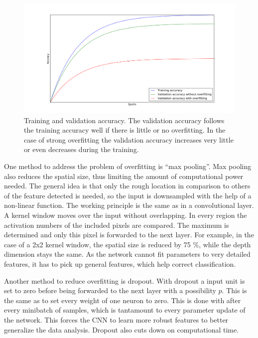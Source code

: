 \begin{figure}
\centering
\includegraphics[scale=0.35]{overfittingacc.png}
\caption{Training and validation accuracy. The validation accuracy follows the training accuracy well if there is little or no overfitting. In the case of strong overfitting the validation accuracy increases very little or even decreases during the training.}
\label{accuracy}
\end{figure}
One method to address the problem of overfitting is \enquote{max pooling}. Max pooling also reduces the spatial size, thus limiting the amount of computational power needed. The general idea is that only the rough location in comparison to others of the feature detected is needed, so the input is downsampled with the help of a non-linear function. The working principle is the same as in a convolutional layer. A kernel window moves over the input without overlapping. In every region the activation numbers of the included pixels are compared. The maximum is determined and only this pixel is forwarded to the next layer. For example, in the case of a 2x2 kernel window, the spatial size is reduced by 75 \%, while the depth dimension stays the same. As the network cannot fit parameters to very detailed features, it has to pick up general features, which help correct classification. 

Another method to reduce overfitting is dropout. With dropout a input unit is set to zero before being forwarded to the next layer with a possibility $p$. This is the same as to set every weight of one neuron to zero. This is done with after every minibatch of samples, which is tantamount to every parameter update of the network. This forces the CNN to learn more robust features to better generalize the data analysis. Dropout also cuts down on computational time. 

